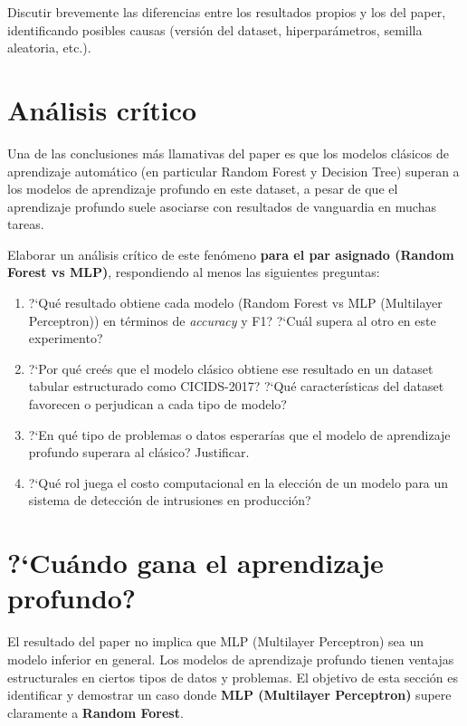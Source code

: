 \documentclass[11pt,a4paper]{article}
\begin{document}
Discutir brevemente las diferencias entre los resultados propios y los del paper, identificando posibles causas (versi\'on del dataset, hiperpar\'ametros, semilla aleatoria, etc.).

\section{An\'alisis cr\'itico}
Una de las conclusiones m\'as llamativas del paper es que los modelos cl\'asicos de aprendizaje autom\'atico (en particular Random Forest y Decision Tree) superan a los modelos de aprendizaje profundo en este dataset, a pesar de que el aprendizaje profundo suele asociarse con resultados de vanguardia en muchas tareas.

Elaborar un an\'alisis cr\'itico de este fen\'omeno \textbf{para el par asignado (Random Forest vs MLP)}, respondiendo al menos las siguientes preguntas:
\begin{enumerate}[leftmargin=2em,itemsep=2pt]
    \item ?`Qu\'e resultado obtiene cada modelo (Random Forest vs MLP (Multilayer Perceptron)) en t\'erminos de \textit{accuracy} y F1? ?`Cu\'al supera al otro en este experimento?
    \item ?`Por qu\'e cre\'es que el modelo cl\'asico obtiene ese resultado en un dataset tabular estructurado como CICIDS-2017? ?`Qu\'e caracter\'isticas del dataset favorecen o perjudican a cada tipo de modelo?
    \item ?`En qu\'e tipo de problemas o datos esperar\'ias que el modelo de aprendizaje profundo superara al cl\'asico? Justificar.
    \item ?`Qu\'e rol juega el costo computacional en la elecci\'on de un modelo para un sistema de detecci\'on de intrusiones en producci\'on?
\end{enumerate}

\section{?`Cu\'ando gana el aprendizaje profundo?}
El resultado del paper no implica que MLP (Multilayer Perceptron) sea un modelo inferior en general. Los modelos de aprendizaje profundo tienen ventajas estructurales en ciertos tipos de datos y problemas. El objetivo de esta secci\'on es identificar y demostrar un caso donde \textbf{MLP (Multilayer Perceptron)} supere claramente a \textbf{Random Forest}.
\end{document}
